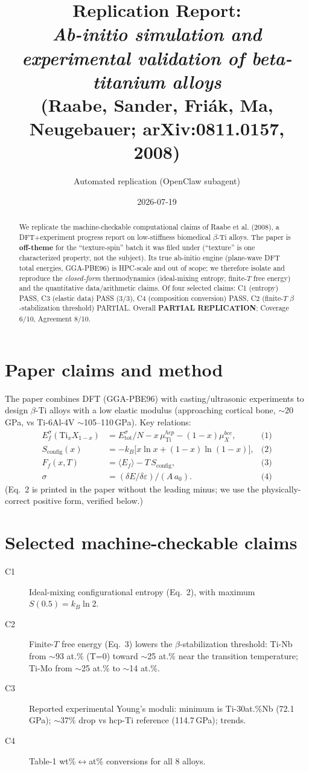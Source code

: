 \documentclass[11pt]{article}
\title{Replication Report: \\ \emph{Ab-initio simulation and experimental validation of beta-titanium alloys} \\ (Raabe, Sander, Fri\'ak, Ma, Neugebauer; arXiv:0811.0157, 2008)}
\author{Automated replication (OpenClaw subagent)}
\date{2026-07-19}
\begin{document}
\maketitle

\begin{abstract}
We replicate the machine-checkable computational claims of Raabe et al. (2008), a DFT+experiment
progress report on low-stiffness biomedical $\beta$-Ti alloys. The paper is \textbf{off-theme}
for the ``texture-spin'' batch it was filed under (``texture'' is one characterized property, not
the subject). Its true ab-initio engine (plane-wave DFT total energies, GGA-PBE96) is HPC-scale
and out of scope; we therefore isolate and reproduce the \emph{closed-form} thermodynamics
(ideal-mixing entropy, finite-$T$ free energy) and the quantitative data/arithmetic claims.
Of four selected claims: C1 (entropy) PASS, C3 (elastic data) PASS (3/3), C4 (composition
conversion) PASS, C2 (finite-$T$ $\beta$-stabilization threshold) PARTIAL. Overall
\textbf{PARTIAL REPLICATION}; Coverage 6/10, Agreement 8/10.
\end{abstract}

\section{Paper claims and method}
The paper combines DFT (GGA-PBE96) with casting/ultrasonic experiments to design $\beta$-Ti alloys
with a low elastic modulus (approaching cortical bone, $\sim$20\,GPa, vs Ti-6Al-4V $\sim$105--110\,GPa).
Key relations:
\begin{align}
E_f^\sigma(\mathrm{Ti}_xX_{1-x}) &= E_\mathrm{tot}^\sigma/N - x\,\mu_\mathrm{Ti}^{hcp} - (1-x)\mu_X^{bcc}, & \text{(1)}\\
S_\mathrm{config}(x) &= -k_B\big[x\ln x + (1-x)\ln(1-x)\big], & \text{(2)}\\
F_f(x,T) &= \langle E_f\rangle - T\,S_\mathrm{config}, & \text{(3)}\\
\sigma &= (\delta E/\delta\varepsilon)/(A\,a_0). & \text{(4)}
\end{align}
(Eq.~2 is printed in the paper without the leading minus; we use the physically-correct positive
form, verified below.)

\section{Selected machine-checkable claims}
\begin{description}
\item[C1] Ideal-mixing configurational entropy (Eq.~2), with maximum $S(0.5)=k_B\ln 2$.
\item[C2] Finite-$T$ free energy (Eq.~3) lowers the $\beta$-stabilization threshold: Ti-Nb from
  $\sim$93 at.\% (T=0) toward $\sim$25 at.\% near the transition temperature; Ti-Mo from
  $\sim$25 at.\% to $\sim$14 at.\%.
\item[C3] Reported experimental Young's moduli: minimum is Ti-30at.\%Nb (72.1\,GPa); $\sim$37\%
  drop vs hcp-Ti reference (114.7\,GPa); trends.
\item[C4] Table-1 wt\%$\leftrightarrow$at\% conversions for all 8 alloys.
\end{description}
\end{document}
